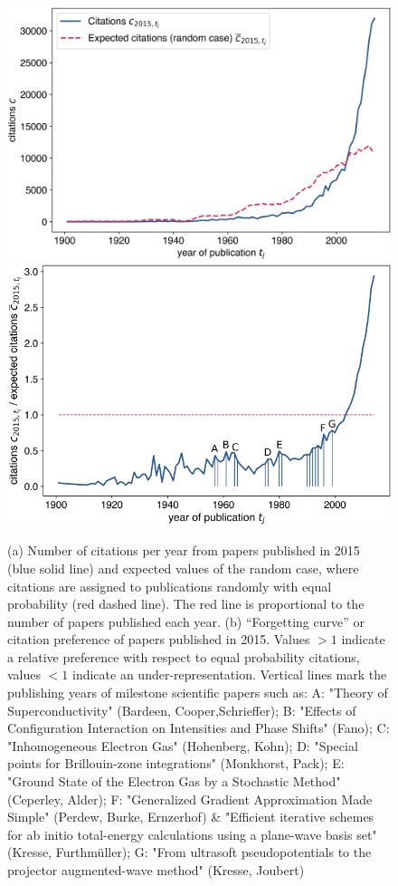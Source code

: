 \documentclass[fleqn,10pt]{wlscirep}
\begin{document}
\begin{figure}[h!]
	\centering
	  \includegraphics[width=0.7\columnwidth]{1b.png}
	  \includegraphics[width=0.68\columnwidth]{1c.png}
		\caption{ 
		(a) Number of citations per year from papers published in 2015 (blue solid line) and expected values of the random case, where citations are assigned to publications randomly with equal probability (red dashed line). The red line is proportional to the number of papers published each year.
		(b) ``Forgetting curve'' or citation preference of papers published in 2015. Values $>1$ indicate a relative preference with respect to equal probability citations, values $<1$ indicate an under-representation.
		Vertical lines mark the publishing years of milestone scientific papers such as:
		A: "Theory of Superconductivity" (Bardeen, Cooper,Schrieffer); B: "Effects of Configuration Interaction on Intensities and Phase Shifts" (Fano); C: "Inhomogeneous Electron Gas" (Hohenberg, Kohn); D: "Special points for Brillouin-zone integrations" (Monkhorst, Pack); E: "Ground State of the Electron Gas by a Stochastic Method"
(Ceperley, Alder); F: "Generalized Gradient Approximation Made Simple" (Perdew, Burke, Ernzerhof) \& "Efficient iterative schemes for ab initio total-energy calculations using a plane-wave basis set" (Kresse, Furthmüller); G: "From ultrasoft pseudopotentials to the projector augmented-wave method" (Kresse, Joubert)}
	\label{fig:aor2}
\end{figure}
\end{document}
